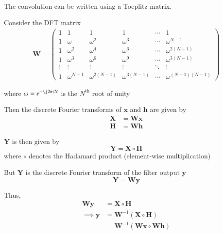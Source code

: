 \documentclass[journal,12pt,twocolumn]{IEEEtran}
\newcommand{\myvec}[1]{\ensuremath{\begin{pmatrix}#1\end{pmatrix}}}
\providecommand{\brak}[1]{\ensuremath{\left(#1\right)}}
\let\vec\mathbf
\numberwithin{equation}{section}
\renewcommand\thesection{\arabic{section}}
\newcommand{\myvec}[1]{\ensuremath{\begin{pmatrix}#1\end{pmatrix}}}
\renewcommand\thesection{\arabic{section}}
\begin{document}
\begin{enumerate}[label=\thesection.\arabic*]
	The convolution can be written using a Toeplitz matrix. 
	
	Consider the DFT matrix
	\begin{align}
		\vec{W} = \myvec{
			1 & 1 & 1 & 1 & \cdots & 1 \\
			1 & \omega & \omega^2 & \omega^3 & \cdots & \omega^{N-1} \\
			1 & \omega^2 & \omega^4 & \omega^6 & \cdots & \omega^{2(N-1)} \\
			1 & \omega^3 & \omega^6 & \omega^9 & \cdots & \omega^{3(N-1)} \\
			\vdots & \vdots & \vdots & \vdots & \ddots & \vdots \\ 
			1 & \omega^{N-1} & \omega^{2(N-1)} & \omega^{3(N-1)} & \cdots & \omega^{(N-1)(N-1)}
		}
	\end{align}
	
	where $\omega = e^{-\j 2\pi/N}$ is the $N^{\mathrm{th}}$ root of unity
	
	Then the discrete Fourier transforms of $\vec{x}$ and $\vec{h}$ are given by
	\begin{align}
		\vec{X} &= \vec{W} \vec{x} \\
		\vec{H} &= \vec{W} \vec{h}
	\end{align}
	
	$\vec{Y}$ is then given by
	\begin{equation}
		\vec{Y} = \vec{X} \circ \vec{H}
	\end{equation}
	where $\circ$ denotes the Hadamard product (element-wise multiplication)
	
	But $\vec{Y}$ is the discrete Fourier transform of the filter output $\vec{y}$
	\begin{equation}
		\vec{Y} = \vec{W} \vec{y}
	\end{equation}
	
	Thus,
	\begin{align}
		\vec{W} \vec{y} &= \vec{X} \circ \vec{H} \\
		\implies \vec{y} &= \vec{W}^{-1} \brak{\vec{X} \circ \vec{H}} \\
		&= \vec{W}^{-1} \brak{\vec{W} \vec{x} \circ \vec{W} \vec{h}}
	\end{align}
\end{enumerate}
%
\end{document}
